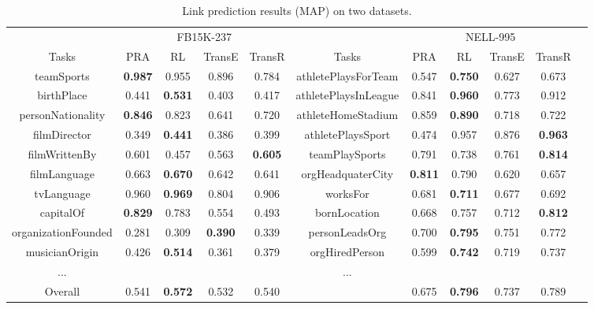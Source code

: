 \documentclass[11pt,letterpaper]{article}
\begin{document}
\begin{table*}[h]
\centering
\small
\begin{tabular}{ccccccccccc}\toprule
& \multicolumn{4}{c}{FB15K-237} & & \multicolumn{4}{c}{NELL-995} \\
\cmidrule{2-5} \cmidrule{7-10}
Tasks & PRA & RL & TransE & TransR & Tasks & PRA & RL & TransE & TransR \\ \midrule
teamSports & \textbf{0.987} & 0.955 & 0.896 & 0.784& athletePlaysForTeam & 0.547 &\textbf{0.750} & 0.627 & 0.673\\
birthPlace & 0.441 & \textbf{0.531} & 0.403 & 0.417 & athletePlaysInLeague & 0.841 & \textbf{0.960} & 0.773 & 0.912\\
personNationality & \textbf{0.846} & 0.823 & 0.641 & 0.720 & athleteHomeStadium & 0.859 & \textbf{0.890} & 0.718 & 0.722\\
filmDirector & 0.349 & \textbf{0.441} & 0.386 & 0.399 & athletePlaysSport& 0.474& 0.957 & 0.876 & \textbf{0.963}\\
filmWrittenBy & 0.601 & 0.457 & 0.563 & \textbf{0.605} & teamPlaySports& 0.791& 0.738 & 0.761 & \textbf{0.814}\\
filmLanguage & 0.663 & \textbf{0.670} & 0.642 & 0.641 & orgHeadquaterCity& \textbf{0.811}& 0.790 & 0.620 & 0.657 \\ 
tvLanguage & 0.960 & \textbf{0.969} & 0.804 & 0.906 & worksFor & 0.681 & \textbf{0.711} & 0.677 & 0.692 \\
capitalOf & \textbf{0.829} & 0.783 & 0.554 & 0.493 &bornLocation & 0.668 & 0.757 & 0.712 & \textbf{0.812}\\
organizationFounded & 0.281 & 0.309 & \textbf{0.390} & 0.339 & personLeadsOrg & 0.700 &\textbf{0.795} & 0.751 & 0.772\\
musicianOrigin & 0.426 & \textbf{0.514} & 0.361 & 0.379 & orgHiredPerson & 0.599 & \textbf{0.742} & 0.719 & 0.737 \\
... & &  & & & ...\\
\midrule
Overall & 0.541 & \textbf{0.572} & 0.532 & 0.540 &  & 0.675& \textbf{0.796} & 0.737 & 0.789\\
\bottomrule
\end{tabular}
\caption{Link prediction results (MAP) on two datasets.}
\label{result1}
\end{table*}
\end{document}

